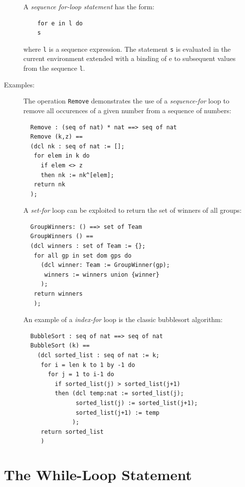 \documentclass{overturerepchap}
\begin{document}
\begin{description}
  A {\it sequence for-loop statement\/} has the form:
  \begin{lstlisting}
    for e in l do
    s
  \end{lstlisting}
  where {\tt l} is a sequence expression. The statement {\tt s} is
  evaluated in the current environment extended with a binding of e to
  subsequent values from the sequence {\tt l}. 

\item[Examples:] The operation \texttt{Remove} demonstrates the use of a 
  \textit{sequence-for} loop to remove all occurences of a given number from a 
  sequence of numbers:
  \begin{lstlisting}
  Remove : (seq of nat) * nat ==> seq of nat
  Remove (k,z) ==
  (dcl nk : seq of nat := [];
   for elem in k do
     if elem <> z
     then nk := nk^[elem];
   return nk
  );
  \end{lstlisting}
\label{removeDef}
  A \textit{set-for} loop can be exploited to return the set of winners of 
  all groups:
  \begin{lstlisting}
  GroupWinners: () ==> set of Team
  GroupWinners () ==
  (dcl winners : set of Team := {};
   for all gp in set dom gps do
     (dcl winner: Team := GroupWinner(gp);
      winners := winners union {winner}
     );
   return winners
   );
  \end{lstlisting}
  An example of a \textit{index-for} loop is the classic bubblesort 
  algorithm:
  \begin{lstlisting}
  BubbleSort : seq of nat ==> seq of nat
  BubbleSort (k) ==
    (dcl sorted_list : seq of nat := k;
     for i = len k to 1 by -1 do
       for j = 1 to i-1 do
         if sorted_list(j) > sorted_list(j+1)
         then (dcl temp:nat := sorted_list(j);
               sorted_list(j) := sorted_list(j+1);
               sorted_list(j+1) := temp
              );
     return sorted_list
     )
\end{lstlisting}
\end{description}

\section{The While-Loop Statement}
\end{document}
